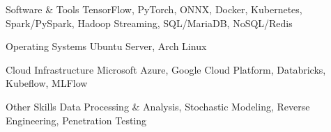 \vspace{-4mm}
\vspace{-2mm}

\begin{cvskills}

	\cvskill
	{Software \& Tools}
	{TensorFlow, PyTorch, ONNX, Docker, Kubernetes, Spark/PySpark, Hadoop Streaming, SQL/MariaDB, NoSQL/Redis}

	\cvskill
	{Operating Systems}
	{Ubuntu Server, Arch Linux}

	\cvskill
	{Cloud Infrastructure}
	{Microsoft Azure, Google Cloud Platform, Databricks, Kubeflow, MLFlow}

	\cvskill
	{Other Skills}
	{Data Processing \& Analysis, Stochastic Modeling, Reverse Engineering, Penetration Testing}

\end{cvskills}
